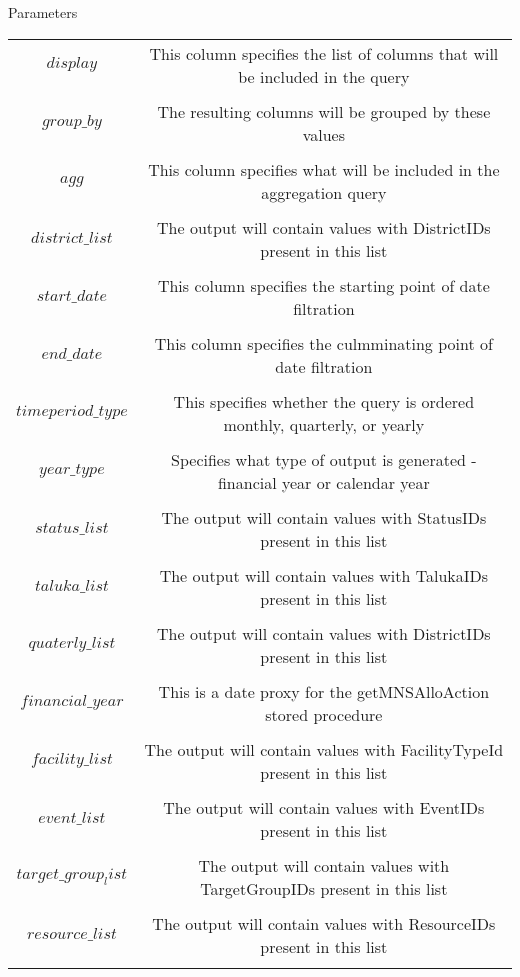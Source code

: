 \documentclass[
10pt, %
a4paper, %
oneside, %
headinclude,footinclude, %
BCOR5mm, %
]{scrartcl}
\begin{document}
\begin{section}{Parameters}

\begin{center}

\begin{tabular}{c|c}
\hline 
$display$ & This column specifies the list of columns that will be included in the query \\ \\ 
\hline 
 $group\_by$ & The resulting columns will be grouped by these values \\ \\
\hline 
$agg$ &  This column specifies what will be included in the aggregation query \\ \\ 
\hline 
 $district\_list$ &  The output will contain values with DistrictIDs present in this list\\ \\ 
\hline 
$start\_date$ & This column specifies the starting point of date filtration \\ \\
\hline 
$end\_date$ & This column specifies the culmminating point of date filtration  \\ \\
\hline 
$timeperiod\_type$  & This specifies whether the query is ordered monthly, quarterly, or yearly  \\ \\ 
\hline 
$year\_type$  & Specifies what type of output is generated - financial year or calendar year \\ \\ 
\hline 
$status\_list$  & The output will contain values with StatusIDs present in this list \\ \\ 
\hline 
$taluka\_list$ & The output will contain values with TalukaIDs present in this list \\ \\ 
\hline 
$quaterly\_list$ & The output will contain values with DistrictIDs present in this list \\ \\ 
\hline 
 $financial\_year$ & This is a date proxy for the getMNSAlloAction stored procedure  \\ \\ 
\hline 
$facility\_list$ &  The output will contain values with FacilityTypeId present in this list\\ \\ 
\hline 
 $event\_list$ & The output will contain values with EventIDs present in this list   \\ \\ 
\hline 
$target\_group_list$ & The output will contain values with TargetGroupIDs present in this list \\ \\ 
\hline 
$resource\_list$ & The output will contain values with ResourceIDs present in this list  \\ \\ 
\hline 
\end{tabular} 


\end{center}
\end{section}
\end{document}
